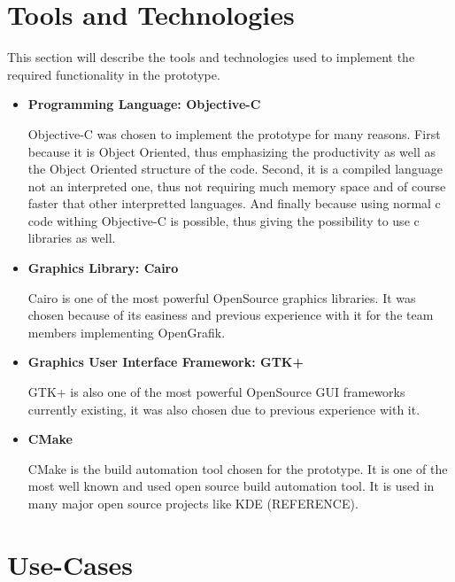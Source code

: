 \section{Tools and Technologies}
This section will describe the tools and technologies used to implement the required functionality in the prototype.
\begin{itemize}
\item {\bf Programming Language: Objective-C}
\par \noindent
Objective-C was chosen to implement the prototype for many reasons. First because it is Object Oriented, thus emphasizing the productivity as well as the Object Oriented structure of the code. Second, it is a compiled language not an interpreted one, thus not requiring much memory space and of course faster that other interpretted languages. And finally because using normal c code withing Objective-C is possible, thus giving the possibility to use c libraries as well.

\item {\bf Graphics Library: Cairo}
\par \noindent
Cairo is one of the most powerful OpenSource graphics libraries. It was chosen because of its easiness and previous experience with it for the team members implementing OpenGrafik.

\item {\bf Graphics User Interface Framework: GTK+}
\par \noindent
GTK+ is also one of the most powerful OpenSource GUI frameworks currently existing, it was also chosen due to previous experience with it.

\item {\bf CMake}
\par \noindent
CMake is the build automation tool chosen for the prototype. It is one of the most well known and used open source build automation tool. It is used in many major open source projects like KDE (REFERENCE).
\end{itemize}

\section{Use-Cases}

